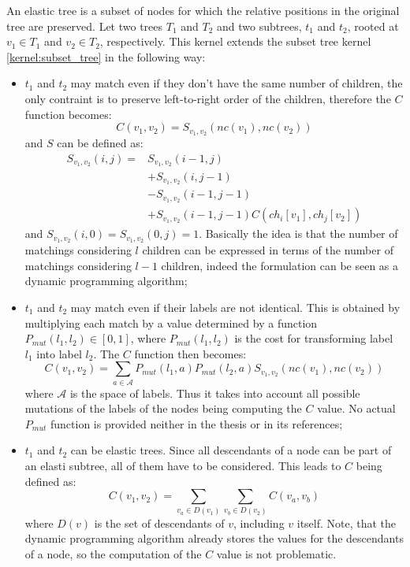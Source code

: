 An elastic tree is a subset of nodes for which the relative positions in the
original tree are preserved. 
Let two trees $T_1$ and $T_2$ and two subtrees, $t_1$ and $t_2$, rooted at 
$v_1 \in T_1$ and $v_2 \in T_2$, respectively. 
This kernel extends the subset tree kernel \autoref{kernel:subset_tree}
in the following way:
\begin{itemize}
	\item $t_1$ and $t_2$ may match even if they don't have the same number of
	children, the only contraint is to preserve left-to-right order of the
	children, therefore the $C$ function becomes:
	\begin{equation}
		C(v_1, v_2) = S_{v_1, v_2}(nc(v_1), nc(v_2))
	\end{equation}
	and $S$ can be defined as:
	\begin{align*}
		S_{v_1, v_2}(i, j) = & S_{v_1, v_2}(i - 1, j)			\\
		& + S_{v_1, v_2}(i, j - 1)								\\			
		& - S_{v_1, v_2}(i - 1, j - 1)							\\
		& + S_{v_1, v_2}(i - 1, j - 1) C(ch_i[v_1], ch_j[v_2])
	\end{align*}
	and $S_{v_1, v_2}(i, 0) = S_{v_1, v_2}(0, j) = 1$. Basically the idea is
	that the number of matchings considering $l$ children can be expressed in
	terms of the number of matchings considering $l - 1$ children, indeed the
	formulation can be seen as a dynamic programming algorithm;

	\item $t_1$ and $t_2$ may match even if their labels are not identical.
	This is obtained by multiplying each match by a value determined by a
	function $P_{mut}(l_1, l_2) \in [0, 1]$, where $P_{mut}(l_1, l_2)$ is the
	cost for transforming label $l_1$ into label $l_2$. The $C$ function then
	becomes:
	\begin{equation}
		C(v_1, v_2) =
		\sum_{a \in \mathcal{A}}
		P_{mut}(l_1, a)
		P_{mut}(l_2, a)
		S_{v_1, v_2}(nc(v_1), nc(v_2))
	\end{equation}
	where $\mathcal{A}$ is the space of labels. Thus it takes into account all
	possible mutations of the labels of the nodes being computing the $C$ value.
	No actual $P_{mut}$ function is provided neither in the thesis or in its
	references;

	\item $t_1$ and $t_2$ can be elastic trees. Since all descendants of a node
	can be part of an elasti subtree, all of them have to be considered. This
	leads to $C$ being defined as:
	\begin{equation}
		C(v_1, v_2) = 
		\sum_{v_a \in D(v_1)} \sum_{v_b \in D(v_2)}
		C(v_a, v_b)
	\end{equation}
	where $D(v)$ is the set of descendants of $v$, including $v$ itself. Note,
	that the dynamic programming algorithm already stores the values for the
	descendants of a node, so the computation of the $C$ value is not
	problematic.
\end{itemize}

